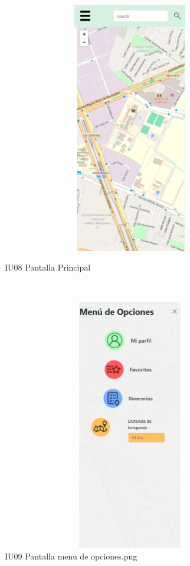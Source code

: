 \begin{figure}[htb]
        \begin{minipage}{1\textwidth}
        \centering
        \includegraphics[width=17cm, height=11cm]{front/PANTALLAS FUNCIONALES 3 DICIEMBRE/IU08_Pantalla Principal.png}
        \caption{IU08 Pantalla Principal}
    \end{minipage}%
    \\
        \begin{minipage}{1\textwidth}
        \centering
        \includegraphics[width=17cm, height=11cm]{front/PANTALLAS FUNCIONALES 3 DICIEMBRE/IU09_Pantalla menu de opciones.png}
        \caption{IU09 Pantalla menu de opciones.png}
    \end{minipage}%
\end{figure}

